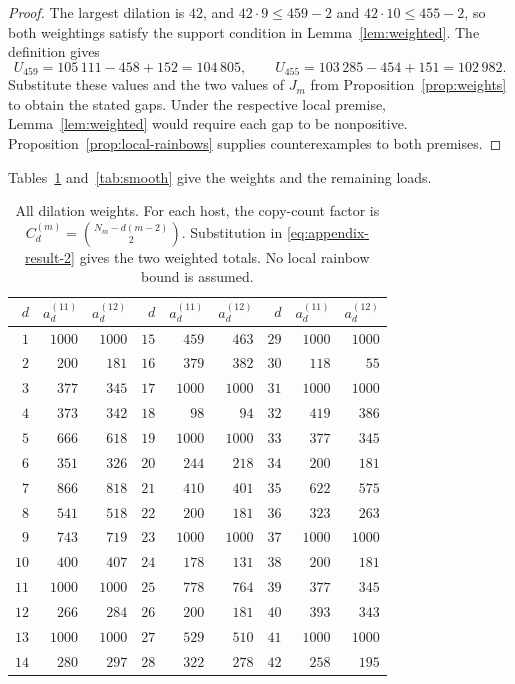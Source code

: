 \documentclass[11pt,a4paper]{article}
\theoremstyle{definition}
\numberwithin{equation}{section}
\begin{document}
\begin{proof}
The largest dilation is $42$, and $42\cdot9\le459-2$ and $42\cdot10\le455-2$, so both weightings satisfy the support condition in Lemma~\ref{lem:weighted}. The definition gives
\[
U_{459}=105\,111-458+152=104\,805,\qquad
U_{455}=103\,285-454+151=102\,982.
\]
Substitute these values and the two values of $J_m$ from Proposition~\ref{prop:weights} to obtain the stated gaps. Under the respective local premise, Lemma~\ref{lem:weighted} would require each gap to be nonpositive. Proposition~\ref{prop:local-rainbows} supplies counterexamples to both premises.
\end{proof}


Tables~\ref{tab:weights} and~\ref{tab:smooth} give the weights and the remaining loads.

\begin{table}[!htbp]
\centering\small
\caption{All dilation weights. For each host, the copy-count factor is $C_d^{(m)}=\binom{N_m-d(m-2)}2$. Substitution in \eqref{eq:appendix-result-2} gives the two weighted totals. No local rainbow bound is assumed.}\label{tab:weights}
\begin{tabular}{@{}rrr@{\qquad}rrr@{\qquad}rrr@{}}
\toprule $d$&$a_d^{(11)}$&$a_d^{(12)}$&$d$&$a_d^{(11)}$&$a_d^{(12)}$&$d$&$a_d^{(11)}$&$a_d^{(12)}$\\\midrule
$1$ & $1000$ & $1000$ & $15$ & $459$ & $463$ & $29$ & $1000$ & $1000$ \\
$2$ & $200$ & $181$ & $16$ & $379$ & $382$ & $30$ & $118$ & $55$ \\
$3$ & $377$ & $345$ & $17$ & $1000$ & $1000$ & $31$ & $1000$ & $1000$ \\
$4$ & $373$ & $342$ & $18$ & $98$ & $94$ & $32$ & $419$ & $386$ \\
$5$ & $666$ & $618$ & $19$ & $1000$ & $1000$ & $33$ & $377$ & $345$ \\
$6$ & $351$ & $326$ & $20$ & $244$ & $218$ & $34$ & $200$ & $181$ \\
$7$ & $866$ & $818$ & $21$ & $410$ & $401$ & $35$ & $622$ & $575$ \\
$8$ & $541$ & $518$ & $22$ & $200$ & $181$ & $36$ & $323$ & $263$ \\
$9$ & $743$ & $719$ & $23$ & $1000$ & $1000$ & $37$ & $1000$ & $1000$ \\
$10$ & $400$ & $407$ & $24$ & $178$ & $131$ & $38$ & $200$ & $181$ \\
$11$ & $1000$ & $1000$ & $25$ & $778$ & $764$ & $39$ & $377$ & $345$ \\
$12$ & $266$ & $284$ & $26$ & $200$ & $181$ & $40$ & $393$ & $343$ \\
$13$ & $1000$ & $1000$ & $27$ & $529$ & $510$ & $41$ & $1000$ & $1000$ \\
$14$ & $280$ & $297$ & $28$ & $322$ & $278$ & $42$ & $258$ & $195$ \\
\bottomrule
\end{tabular}
\end{table}
\end{document}

